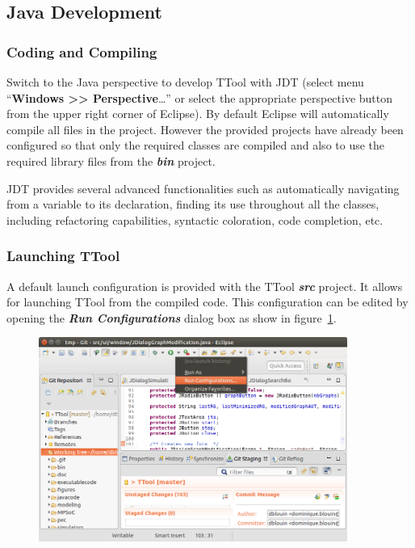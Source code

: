 \documentclass[12pt]{article}
\begin{document}
\subsection{Java Development}

\subsubsection{Coding and Compiling}

Switch to the Java perspective to develop TTool with JDT (select menu
``\textbf{Windows >> Perspective}\ldots'' or select the appropriate perspective button from
the upper right corner of Eclipse). By default Eclipse will automatically
compile all files in the project. However the provided projects have already
been configured so that only the required classes are compiled and also to use
the required library files from the \textbf{\textit{bin}} project.

JDT provides several advanced functionalities such as automatically navigating
from a variable to its declaration, finding its use throughout all the classes,
including refactoring capabilities, syntactic coloration, code completion, etc.

\subsubsection{Launching TTool}
\label{sec:launch}

A default launch configuration is provided with the TTool \textbf{\textit{src}} project.
It allows for launching TTool from the compiled code. This configuration can be
edited by opening the \textbf{\textit{Run Configurations}} dialog box as show in figure~\ref{fig:image8}.

\begin{figure}[H]
\begin{center}
\includegraphics[width=0.9\textwidth]{images/image9.png}
\end{center}
\caption{}
\label{fig:image8}
\end{figure}
\end{document}
